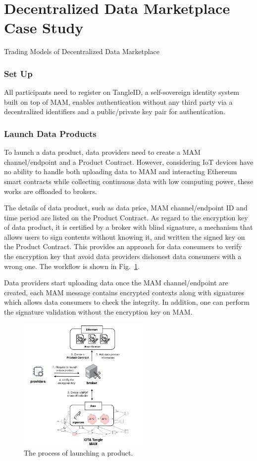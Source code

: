 \documentclass[conference]{IEEEtran}
\begin{document}
\section{Decentralized Data Marketplace Case Study}
Trading Models of Decentralized Data Marketplace
\subsubsection{Set Up}
All participants need to register on TangleID\cite{TangleID}, a self-sovereign identity system built on top of MAM, enables authentication without any third party via a decentralized identifiers and a public/private key pair for authentication.

\subsubsection{Launch Data Products}
To launch a data product, data providers need to create a MAM channel/endpoint and a Product Contract. However, considering IoT devices have no ability to handle both uploading data to MAM and interacting Ethereum smart contracts while collecting continuous data with low computing power, these works are offloaded to brokers. 

The details of data product, such as data price, MAM channel/endpoint ID and time period are listed on the Product Contract. As regard to the encryption key of data product, it is certified by a broker with blind signature\cite{blindSig}, a mechanism that allows users to sign contents without knowing it, and written the signed key on the Product Contract. This provides an approach for data consumers to verify the encryption key that avoid data providers dishonest data consumers with a wrong one. The workflow is shown in Fig.~\ref{fig:launching_product}.

Data providers start uploading data once the MAM channel/endpoint are created, each MAM message contains encrypted contexts along with signatures which allows data consumers to check the integrity. In addition, one can perform the signature validation without the encryption key on MAM.
 
\begin{figure}[!t]
    \centering
    \includegraphics[width=2.5in]{launching_product}
    \caption{The process of launching a product.}
    \label{fig:launching_product}
\end{figure}
\end{document}
